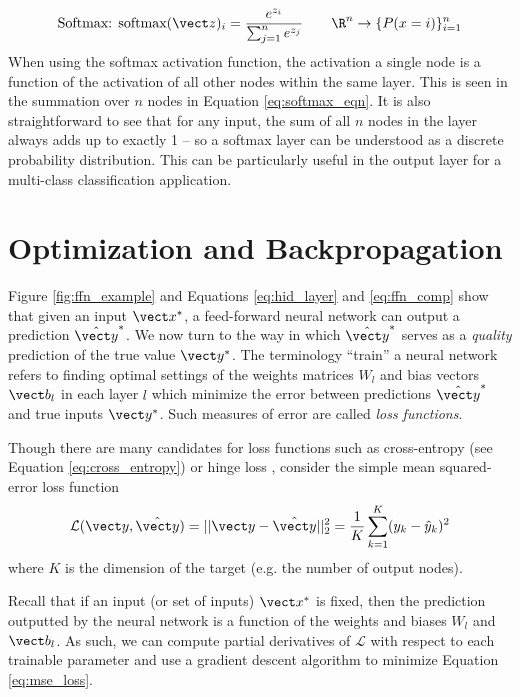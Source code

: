 \begin{equation}
  \text{Softmax: } \text{softmax}(\vect z)_i = \frac{e^{z_i}}{\sum_{j=1}^n e^{z_j}} \quad \quad \R^n \to \{P(x=i)\}_{i=1}^n
  \label{eq:softmax_eqn}
\end{equation}
When using the softmax activation function, the activation a single node is a function of the activation of all other nodes within the same layer. This is seen in the summation over $n$ nodes in Equation \ref{eq:softmax_eqn}. It is also straightforward to see that for any input, the sum of all $n$ nodes in the layer always adds up to exactly 1 -- so a softmax layer can be understood as a discrete probability distribution. This can be particularly useful in the output layer for a multi-class classification application.


\section{Optimization and Backpropagation}\label{apdx:backprop}
Figure \ref{fig:ffn_example} and Equations \ref{eq:hid_layer} and \ref{eq:ffn_comp} show that given an input $\vect x^*$, a feed-forward neural network can output a prediction $\hat{\vect y}^*$. We now turn to the way in which $\hat{\vect y}^*$ serves as a \textit{quality} prediction of the true value $\vect y^*$. The terminology ``train'' a neural network refers to finding optimal settings of the weights matrices $W_l$ and bias vectors $\vect b_l$ in each layer $l$ which minimize the error between predictions $\hat{\vect y}^*$ and true inputs $\vect y^*$. Such measures of error are called \textit{loss functions}.

Though there are many candidates for loss functions such as cross-entropy (see Equation \ref{eq:cross_entropy}) or hinge loss \cite{gentile1998}, consider the simple mean squared-error loss function
\begin{equation}
  \mathcal{L}(\vect y, \hat{\vect y}) = ||\vect y - \hat{\vect y}||_2^2 = \frac{1}{K} \sum_{k=1}^K (y_k - \hat{y}_k)^2
  \label{eq:mse_loss}
\end{equation}
where $K$ is the dimension of the target (e.g. the number of output nodes).

Recall that if an input (or set of inputs) $\vect x^*$ is fixed, then the prediction outputted by the neural network is a function of the weights and biases $W_l$ and $\vect b_l$. As such, we can compute partial derivatives of $\mathcal{L}$ with respect to each trainable parameter and use a gradient descent algorithm to minimize Equation \ref{eq:mse_loss}.

